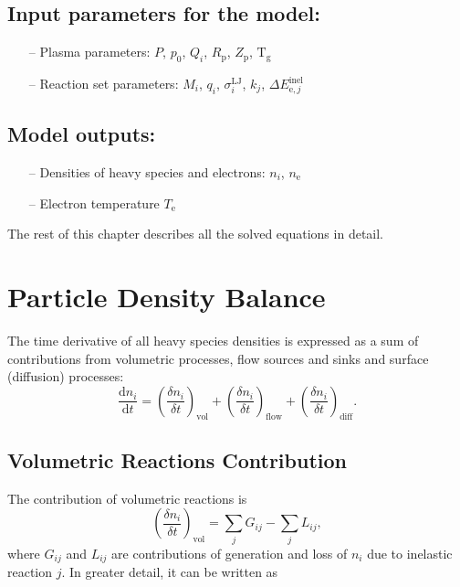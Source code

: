 \subsection{Input parameters for the model:}
\begin{itemize}
    \item[--] Plasma parameters:
    $P$, $p_{0}$, $Q_{i}$, $R_{\mathrm{p}}$, $Z_{\mathrm{p}}$, $\mathrm{T}_{\mathrm{g}}$
    \item[--] Reaction set parameters:
    $M_{i}$, $q_{i}$, $\sigma^{\mathrm{LJ}}_{i}$, $k_{j}$, $\Delta E_{\mathrm{e}, j}^{\mathrm{inel}}$
\end{itemize}

\subsection{Model outputs:}
\begin{itemize}
    \item[--] Densities of heavy species and electrons: $n_{i}$, $n_{\mathrm{e}}$
    \item[--] Electron temperature $T_{\mathrm{e}}$
\end{itemize}
The rest of this chapter describes all the solved equations in detail.

\section{Particle Density Balance}\label{sec:03-particle-density-balance}
The time derivative of all heavy species densities is expressed as a sum of contributions from volumetric processes,
flow sources and sinks and surface (diffusion) processes:
\begin{equation}
    \frac{\mathrm{d} n_{i}}{\mathrm{d} t} =
    \left( \frac{\delta n_{i}}{\delta t} \right)_{\mathrm{vol}} +
    \left( \frac{\delta n_{i}}{\delta t} \right)_{\mathrm{flow}} +
    \left( \frac{\delta n_{i}}{\delta t} \right)_{\mathrm{diff}}.
    \label{eq:03-pbe}
\end{equation}

\subsection{Volumetric Reactions Contribution}\label{subsec:03-volumetric-reactions-contribution}
The contribution of volumetric reactions is
\begin{equation}
    \left( \frac{\delta n_{i}}{\delta t} \right)_{\mathrm{vol}} = \sum_{j} G_{ij} - \sum_{j} L_{ij},
\end{equation}
where $G_{ij}$ and $L_{ij}$ are contributions of generation and loss of $ n_{i} $ due to inelastic reaction $ j $.
In greater detail, it can be written as

